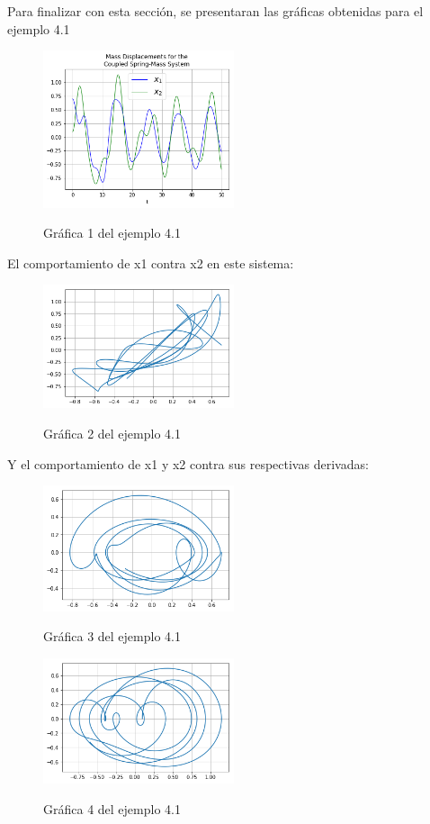 \documentclass{article}
\begin{document}
Para finalizar con esta sección, se presentaran las gráficas obtenidas para el ejemplo 4.1
\begin{figure}[H]
    \caption{Gráfica 1 del ejemplo 4.1}
    \includegraphics[width=0.5\textwidth]{Grafica26.png}
    \centering
    \label{Cod}
\end{figure}
El comportamiento de x1 contra x2 en este sistema:
\begin{figure}[H]
    \caption{Gráfica 2 del ejemplo 4.1}
    \includegraphics[width=0.5\textwidth]{Grafica29.png}
    \centering
    \label{Cod}
\end{figure}
Y el comportamiento de x1 y x2 contra sus respectivas derivadas:
\begin{figure}[H]
    \caption{Gráfica 3 del ejemplo 4.1}
    \includegraphics[width=0.5\textwidth]{Grafica27.png}
    \centering
    \label{Cod}
\end{figure}
\begin{figure}[H]
    \caption{Gráfica 4 del ejemplo 4.1}
    \includegraphics[width=0.5\textwidth]{Grafica28.png}
    \centering
    \label{Cod}
\end{figure}
\end{document}
